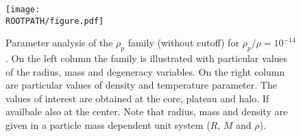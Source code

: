 \begin{figure}%
	\centering%
	\texttt{[image: \\ROOTPATH/figure.pdf]}
	\caption{Parameter analysis of the $\rho_p$ family (without cutoff) for $\rho_p/\rho = 10^{-14}$. On the left column the family is illustrated with particular values of the radius, mass and degeneracy variables. On the right column are particular values of density and temperature parameter. The values of interest are obtained at the core, plateau and halo. If availbale also at the center. Note that radius, mass and density are given in a particle mass dependent unit system ($R$, $M$ and $\rho$).}%
	\label{fig:analysis:without-cutoff:plateau-density:raw}%
\end{figure}